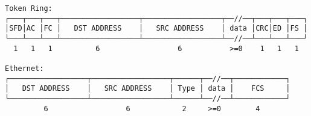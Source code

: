 \documentclass[varwidth=45em,crop]{standalone}
\begin{document}
\begin{verbatim}
Token Ring:
┌───┬───┬───┬──────────────────┬──────────────────┬──//──┬───┬───┬───┐
│SFD│AC │FC │   DST ADDRESS    │   SRC ADDRESS    │ data │CRC│ED │FS │
└───┴───┴───┴──────────────────┴──────────────────┴──//──┴───┴───┴───┘
  1   1   1          6                  6           >=0    1   1   1

Ethernet:
┌──────────────────┬──────────────────┬──────┬──//──┬────────────┐
│   DST ADDRESS    │   SRC ADDRESS    │ Type │ data │    FCS     │
└──────────────────┴──────────────────┴──────┴──//──┴────────────┘
         6                  6            2     >=0        4
\end{verbatim}
\end{document}
